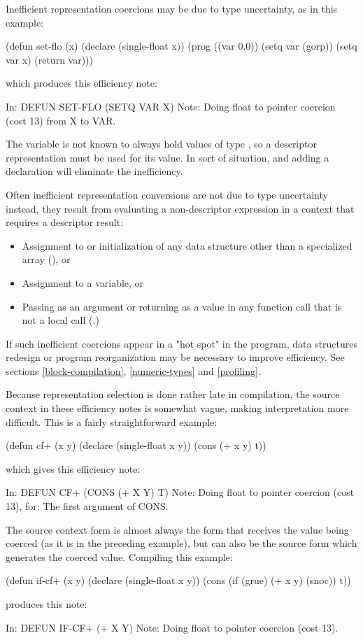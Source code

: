 {Inefficient representation coercions may be due to type uncertainty, as in this example:
\begin{lisp}
(defun set-flo (x)
  (declare (single-float x))
  (prog ((var 0.0))
    (setq var (gorp))
    (setq var x)
    (return var)))
\end{lisp}
which produces this efficiency note:
\begin{example}
In: DEFUN SET-FLO
  (SETQ VAR X)
Note: Doing float to pointer coercion (cost 13) from X to VAR.
\end{example}
The variable  is not known to always hold values of type
, so a descriptor representation must be used for its value.
In sort of situation, and adding a declaration will eliminate the inefficiency.

Often inefficient representation conversions are not due to type uncertainty
\dash{} instead, they result from evaluating a non-descriptor expression in a
context that requires a descriptor result:
\begin{itemize}

\item
Assignment to or initialization of any data structure other than a specialized
array (), or

\item
Assignment to a  variable, or

\item
Passing as an argument or returning as a value in any function call that is not
a local call (.)
\end{itemize}

If such inefficient coercions appear in a "hot spot" in the program, data
structures redesign or program reorganization may be necessary to improve
efficiency.  See sections \ref{block-compilation}, \ref{numeric-types} and
\ref{profiling}.

Because representation selection is done rather late in compilation, the source
context in these efficiency notes is somewhat vague, making interpretation more
difficult.  This is a fairly straightforward example:
\begin{lisp}
(defun cf+ (x y)
  (declare (single-float x y))
  (cons (+ x y) t))
\end{lisp}
which gives this efficiency note:
\begin{example}
In: DEFUN CF+
  (CONS (+ X Y) T)
Note: Doing float to pointer coercion (cost 13), for:
      The first argument of CONS.
\end{example}
The source context form is almost always the form that receives the value being
coerced (as it is in the preceding example), but can also be the source form
which generates the coerced value.  Compiling this example:
\begin{lisp}
(defun if-cf+ (x y)
  (declare (single-float x y))
  (cons (if (grue) (+ x y) (snoc)) t))
\end{lisp}
produces this note:
\begin{example}
In: DEFUN IF-CF+
  (+ X Y)
Note: Doing float to pointer coercion (cost 13).
\end{example}

}

